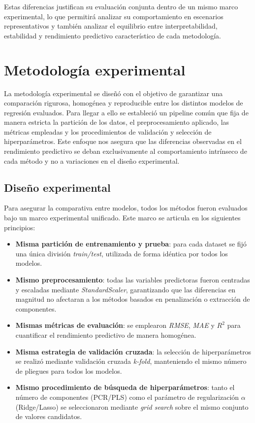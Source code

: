 \documentclass[12pt,a4paper]{report}
\begin{document}
Estas diferencias justifican su evaluación conjunta dentro de un mismo marco experimental, lo que permitirá analizar su comportamiento en escenarios representativos y también analizar el equilibrio entre interpretabilidad, estabilidad y rendimiento predictivo característico de cada metodología.


\chapter{Metodología experimental}

La metodología experimental se diseñó con el objetivo de garantizar una comparación rigurosa, homogénea y reproducible entre los distintos modelos de regresión evaluados. Para llegar a ello se estableció un pipeline común que fija de manera estricta la partición de los datos, el preprocesamiento aplicado, las métricas empleadas y los procedimientos de validación y selección de hiperparámetros. Este enfoque nos asegura que las diferencias observadas en el rendimiento predictivo se deban exclusivamente al comportamiento intrínseco de cada método y no a variaciones en el diseño experimental.

\section{Diseño experimental}

Para asegurar la comparativa entre modelos, todos los métodos fueron evaluados bajo un marco experimental unificado. Este marco se articula en los siguientes principios:

\begin{itemize}
    \item \textbf{Misma partición de entrenamiento y prueba}: para cada dataset se fijó una única división \textit{train/test}, utilizada de forma idéntica por todos los modelos.

    \item \textbf{Mismo preprocesamiento}: todas las variables predictoras fueron centradas y escaladas mediante \textit{StandardScaler}, garantizando que las diferencias en magnitud no afectaran a los métodos basados en penalización o extracción de componentes.

    \item \textbf{Mismas métricas de evaluación}: se emplearon \textit{RMSE}, \textit{MAE} y $R^{2}$ para cuantificar el rendimiento predictivo de manera homogénea.

    \item \textbf{Misma estrategia de validación cruzada}: la selección de hiperparámetros  se realizó mediante validación cruzada \textit{k-fold}, manteniendo el mismo número de  pliegues para todos los modelos.

    \item \textbf{Mismo procedimiento de búsqueda de hiperparámetros}: tanto el número de componentes (PCR/PLS) como el parámetro de regularización $\alpha$ (Ridge/Lasso) se seleccionaron mediante \textit{grid search} sobre el mismo conjunto de valores candidatos.
\end{itemize}
\end{document}

